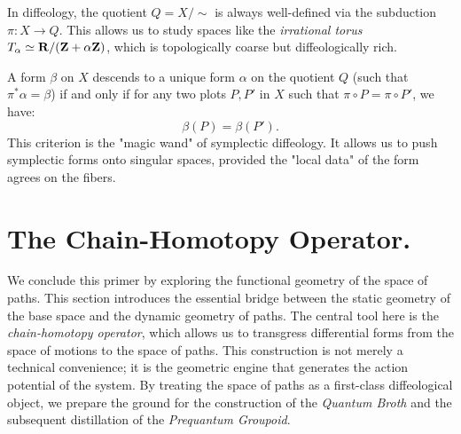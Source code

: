 \documentclass[10pt,reqno,letterpaper,twoside]{amsbook}
\begin{document}
  \begin{article}
    In diffeology,
    the quotient $Q = X/\!\!\sim$ is always well-defined via the subduction $\pi: X \to Q$.
    This allows us to study spaces like the \emph{irrational torus} $T_\alpha \simeq {\mathbf{R}} / ({\mathbf{Z}} + \alpha{\mathbf{Z}})$,
    which is topologically coarse but diffeologically rich.
    
    A form $\beta$ on $X$ descends to a unique form $\alpha$ on the quotient $Q$
    (such that $\pi^*\alpha = \beta$)
    if and only if for any two plots $P, P'$ in $X$ such that $\pi \circ P = \pi \circ P'$,
    we have:
    \[
      \beta(P) = \beta(P').
      \]
    This criterion is the "magic wand" of symplectic diffeology.
    It allows us to push symplectic forms onto singular spaces,
    provided the "local data" of the form agrees on the fibers.
  \end{article}
  
  \section{The Chain-Homotopy Operator.}
  \label{sec:The Chain-Homotopy Operator}
  
  We conclude this primer by exploring the functional geometry of the space of paths.
  This section introduces the essential bridge between the static geometry of the base space and the dynamic geometry of paths.
  The central tool here is the \emph{chain-homotopy operator},
  which allows us to transgress differential forms from the space of motions to the space of paths.
  This construction is not merely a technical convenience;
  it is the geometric engine that generates the action potential of the system.
  By treating the space of paths as a first-class diffeological object,
  we prepare the ground for the construction of the \emph{Quantum Broth} and the subsequent distillation of the \emph{Prequantum Groupoid}.
  
\end{document}
